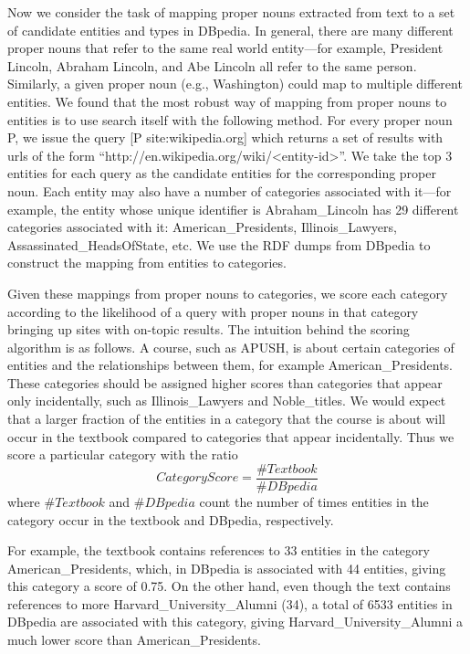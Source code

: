 \documentclass[pdfpagelabels=false,plainpages=true]{acm_proc_article-sp}
\begin{document}
Now we consider the task of mapping proper nouns extracted from text
to a set of candidate entities and types in DBpedia. In general, there are many
different proper nouns that refer to the same real world entity---for example,
President Lincoln, Abraham Lincoln, and Abe Lincoln all refer to the same 
person. Similarly, a given proper noun (e.g., Washington) could map to multiple
different entities. We found that the most robust way of mapping from proper
nouns to entities is to use search itself with the following method. For every
proper noun P, we issue the query [P site:wikipedia.org] which returns a set of
results with urls of the form ``http://\-en.wikipedia.org/wiki/<entity-id>''. We take
the top 3 entities for each query as the candidate entities for the corresponding
proper noun. Each entity may also have a number of categories associated with it---for  
example, the entity whose unique identifier is Abraham\_Lincoln has 29
different categories associated with it: American\_Presidents,
Illinois\_Lawyers, Assassinated\_HeadsOfState, etc. We use the RDF dumps from
DBpedia to construct the mapping from entities to categories.

Given these mappings from proper nouns to categories, we score each category
according to the likelihood of a query with proper nouns in that category
bringing up sites with on-topic results. The intuition behind the
scoring algorithm is as follows. A course, such as APUSH, is about certain
categories of entities and the relationships between them, for example
American\_Presidents. These categories should be assigned higher scores than
categories that appear only incidentally, such as Illinois\_Lawyers and
Noble\_titles. We would expect that a larger fraction of the entities in a
category that the course is about will occur in the textbook compared to
categories that appear incidentally. Thus we score a particular category with
the ratio
\begin{equation}
CategoryScore = \frac{\#Textbook}{\#DBpedia}
\end{equation}
where $\#Textbook$ and $\#DBpedia$ count the number of times entities in
the category occur in the textbook and DBpedia, respectively.

For example, the textbook contains references to 33 entities in the category
American\_Presidents, which, in DBpedia is associated with 44 entities, giving
this category a score of 0.75. On the other hand, even though the text contains
references to more Harvard\_University\_Alumni (34), a total of 6533 entities in
DBpedia are associated with this category, giving Harvard\_University\_Alumni a
much lower score than American\_Presidents. 
\end{document}
